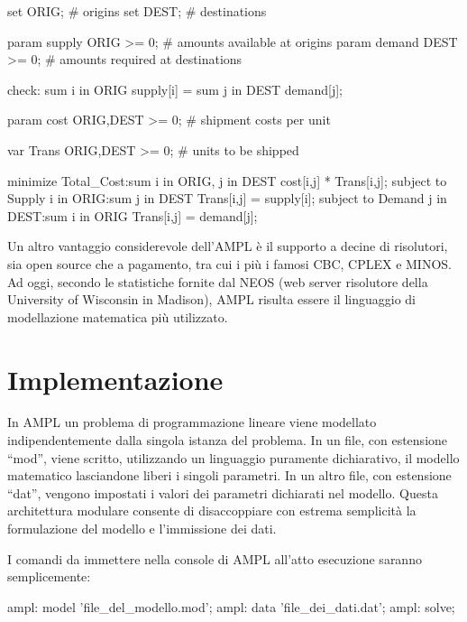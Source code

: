 		\begin{amplcode}
			set ORIG;						# origins
			set DEST;						# destinations

			param supply {ORIG} >= 0;		# amounts available at origins
			param demand {DEST} >= 0;		# amounts required at destinations

			check: sum {i in ORIG} supply[i] = sum {j in DEST} demand[j];
			
			param cost {ORIG,DEST} >= 0;	# shipment costs per unit
			
			var Trans {ORIG,DEST} >= 0;		# units to be shipped

			minimize Total_Cost:sum {i in ORIG, j in DEST} cost[i,j] * Trans[i,j];
			subject to Supply {i in ORIG}:sum {j in DEST} Trans[i,j] = supply[i];
			subject to Demand {j in DEST}:sum {i in ORIG} Trans[i,j] = demand[j];

		\end{amplcode}

		Un altro vantaggio considerevole dell’AMPL è il supporto a decine di risolutori, sia open source che a pagamento, tra cui i più i famosi CBC, CPLEX e MINOS.
		Ad oggi, secondo le statistiche fornite dal NEOS (web server risolutore della University of Wisconsin in Madison), AMPL risulta essere il linguaggio di modellazione matematica più utilizzato.

		\section{Implementazione} %
		\label{sec:implementazione}
			In AMPL un problema di programmazione lineare viene modellato indipendentemente dalla singola istanza del problema. In un file, con estensione “mod”, viene scritto, utilizzando un linguaggio puramente dichiarativo, il modello matematico lasciandone liberi i singoli parametri. In un altro file, con estensione “dat”, vengono impostati i valori dei parametri dichiarati nel modello.
			Questa architettura modulare consente di disaccoppiare con estrema semplicità la formulazione del modello e l’immissione dei dati.

			I comandi da immettere nella console di AMPL all’atto esecuzione saranno semplicemente:	
			\begin{amplcode}
				ampl: model 'file_del_modello.mod';
				ampl: data 'file_dei_dati.dat';
				ampl: solve;
			\end{amplcode}

